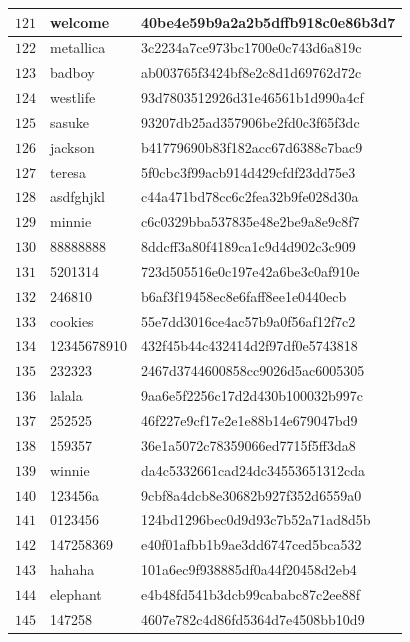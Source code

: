 \begin{longtable}{|l|l|l|}
    $121$ & welcome & 40be4e59b9a2a2b5dffb918c0e86b3d7 \\ \hline
    $122$ & metallica & 3c2234a7ce973bc1700e0c743d6a819c \\ \hline
    $123$ & badboy & ab003765f3424bf8e2c8d1d69762d72c \\ \hline
    $124$ & westlife & 93d7803512926d31e46561b1d990a4cf \\ \hline
    $125$ & sasuke & 93207db25ad357906be2fd0c3f65f3dc \\ \hline
    $126$ & jackson & b41779690b83f182acc67d6388c7bac9 \\ \hline
    $127$ & teresa & 5f0cbc3f99acb914d429cfdf23dd75e3 \\ \hline
    $128$ & asdfghjkl & c44a471bd78cc6c2fea32b9fe028d30a \\ \hline
    $129$ & minnie & c6c0329bba537835e48e2be9a8e9c8f7 \\ \hline
    $130$ & 88888888 & 8ddcff3a80f4189ca1c9d4d902c3c909 \\ \hline
    $131$ & 5201314 & 723d505516e0c197e42a6be3c0af910e \\ \hline
    $132$ & 246810 & b6af3f19458ec8e6faff8ee1e0440ecb \\ \hline
    $133$ & cookies & 55e7dd3016ce4ac57b9a0f56af12f7c2 \\ \hline
    $134$ & 12345678910 & 432f45b44c432414d2f97df0e5743818 \\ \hline
    $135$ & 232323 & 2467d3744600858cc9026d5ac6005305 \\ \hline
    $136$ & lalala & 9aa6e5f2256c17d2d430b100032b997c \\ \hline
    $137$ & 252525 & 46f227e9cf17e2e1e88b14e679047bd9 \\ \hline
    $138$ & 159357 & 36e1a5072c78359066ed7715f5ff3da8 \\ \hline
    $139$ & winnie & da4c5332661cad24dc34553651312cda \\ \hline
    $140$ & 123456a & 9cbf8a4dcb8e30682b927f352d6559a0 \\ \hline
    $141$ & 0123456 & 124bd1296bec0d9d93c7b52a71ad8d5b \\ \hline
    $142$ & 147258369 & e40f01afbb1b9ae3dd6747ced5bca532 \\ \hline
    $143$ & hahaha & 101a6ec9f938885df0a44f20458d2eb4 \\ \hline
    $144$ & elephant & e4b48fd541b3dcb99cababc87c2ee88f \\ \hline
    $145$ & 147258 & 4607e782c4d86fd5364d7e4508bb10d9 \\ \hline

\end{longtable}
